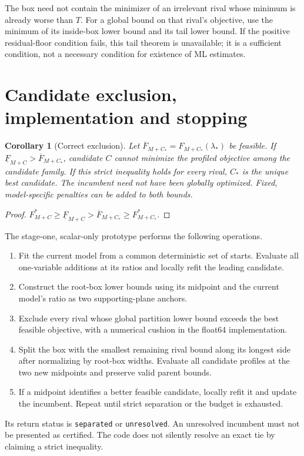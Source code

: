 \documentclass[11pt,a4paper]{article}
\newtheorem{corollary}[theorem]{Corollary}
\theoremstyle{remark}\newtheorem{remark}[theorem]{Remark}
\begin{document}
The box need not contain the minimizer of an irrelevant rival whose minimum is
already worse than $T$. For a global bound on that rival's objective, use the
minimum of its inside-box lower bound and its tail lower bound. If the positive
residual-floor condition fails, this tail theorem is unavailable; it is a
sufficient condition, not a necessary condition for existence of ML estimates.

\section{Candidate exclusion, implementation and stopping}
\begin{corollary}[Correct exclusion]\label{cor:exclude}
Let $\overline F_{M+C_*}=F_{M+C_*}(\lambda_*)$ be feasible. If
$\underline F_{M+C}>\overline F_{M+C_*}$, candidate $C$ cannot minimize the profiled
objective among the candidate family. If this strict inequality holds for every
rival, $C_*$ is the unique best candidate. The incumbent need not have been
globally optimized. Fixed, model-specific penalties can be added to both bounds.
\end{corollary}
\begin{proof}
$F_{M+C}^*\geq\underline F_{M+C}>\overline F_{M+C_*}\geq F_{M+C_*}^*$.
\end{proof}

The stage-one, scalar-only prototype performs the following operations.
\begin{enumerate}
\item Fit the current model from a common deterministic set of starts. Evaluate
all one-variable additions at its ratios and locally refit the leading candidate.
\item Construct the root-box lower bounds using its midpoint and the current
model's ratio as two supporting-plane anchors.
\item Exclude every rival whose global partition lower bound exceeds the best
feasible objective, with a numerical cushion in the float64 implementation.
\item Split the box with the smallest remaining rival bound along its longest
side after normalizing by root-box widths. Evaluate all candidate profiles at the
two new midpoints and preserve valid parent bounds.
\item If a midpoint identifies a better feasible candidate, locally refit it and
update the incumbent. Repeat until strict separation or the budget is exhausted.
\end{enumerate}
Its return status is \texttt{separated} or \texttt{unresolved}.
An unresolved incumbent must not be presented as certified. The code does not
silently resolve an exact tie by claiming a strict inequality.
\end{document}
